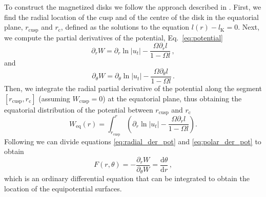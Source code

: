 \documentclass{aa}
\begin{document}

To construct the magnetized disks we follow the approach described in \citet{Qian:2009}. First, we find the radial location of the cusp and of the centre of the disk in the equatorial plane, $r_{\mathrm{cusp}}$ and $r_{\mathrm{c}}$, defined as the solutions to the equation $l(r) - l_{\mathrm{K}} = 0$.
Next, we compute the partial derivatives of the potential, Eq.~\eqref{eq:potential}
\begin{equation}\label{eq:radial_der_pot}
\partial_r W = \partial_r \ln|u_t| - \frac{\Omega \partial_rl}{1 - \Omega l}\,,
\end{equation}
and
\begin{equation}\label{eq:polar_der_pot}
\partial_{\theta} W = \partial_{\theta} \ln|u_t| - \frac{\Omega \partial_{\theta}l}{1 - \Omega l}\,.
\end{equation}
Then, we integrate the radial partial derivative of the potential along the segment $[r_{\mathrm{cusp}}, r_{\mathrm{c}}]$ (assuming $W_{\mathrm{cusp}} = 0$) at the equatorial plane, thus obtaining the equatorial distribution of the potential between $r_{\mathrm{cusp}}$ and $r_{\mathrm{c}}$
\begin{equation}\label{eq:equatorial_pot}
W_{\mathrm{eq}}(r) = \int^{r}_{r_{\mathrm{cusp}}}\left(\partial_r \ln|u_t| - \frac{\Omega \partial_rl}{1 - \Omega l}\right).
\end{equation}
Following \citet{Qian:2009} we can divide equations \eqref{eq:radial_der_pot} and \eqref{eq:polar_der_pot} to obtain
\begin{equation}\label{eq:F}
F(r, \theta) = -\frac{\partial_r W}{\partial_{\theta} W} = \frac{\mathrm{d}\theta}{\mathrm{d}r}\,,
\end{equation}
which is an ordinary differential equation that can be integrated to obtain the location of the equipotential surfaces.
\end{document}

